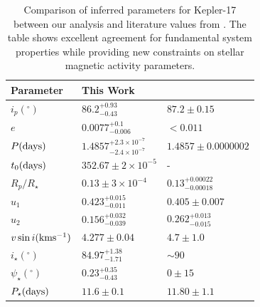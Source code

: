 \documentclass[twocolumn]{aastex631}
\begin{document}
%
\begin{table}[]
    \vspace{0.5cm}
    \centering
    \caption{Comparison of inferred parameters for Kepler-17 between our analysis and literature values from \cite{Desert2011}. 
    The table shows excellent agreement for fundamental system properties while providing new constraints on stellar magnetic activity parameters.}
    \begin{tabular}{lll}
    \hline
    Parameter                                 & This Work                                          & \cite{Desert2011} \\ \hline\hline
    $i_p (^\circ)$                            & $86.2^{+0.93}_{-0.43}$                             & $87.2\pm0.15$                    \\
    $e$                                       & $0.0077^{+0.1}_{-0.006}$                           & $<0.011$                     \\
    $P (\rm days)$                            & $1.4857^{+2.3\times10^{-7}}_{-2.4\times10^{-7}}$   & $1.4857\pm 0.0000002$                   \\
    $t_0 (\rm days)$                          & $352.67\pm 2\times 10^{-5}$                        &    -                 \\
    $R_p / R_\star$                           & $0.13 \pm 3\times10^{-4}$                          &  $0.13^{+0.00022}_{-0.00018}$                   \\ 
    $u_1$                                     & $0.423^{+0.015}_{-0.011}$                          &  $0.405 \pm 0.007$                   \\ 
    $u_2$                                     & $0.156^{+0.032}_{-0.039}$                          &  $0.262^{+0.013}_{-0.015}$                   \\ 
    $v\sin i (\rm kms^{-1})$                  & $4.277\pm0.04$                                     &  $4.7\pm1.0$                   \\ \hline
    $i_\star (^\circ)$                        & $84.97^{+1.38}_{-1.71}$                            &  $\sim90$                    \\
    $\psi_\star (^\circ)$                     & $0.23^{+0.35}_{-0.43}$                             &  $0\pm15$                   \\
    $P_\star (\rm days)$                      & $11.6\pm0.1$                                       & $11.80\pm 1.1$                    \\ 

\end{tabular}
\end{table}
\end{document}
